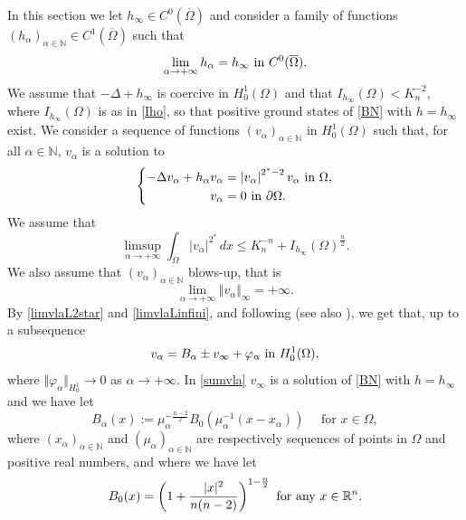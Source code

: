 \documentclass[10pt]{amsart}
\numberwithin{equation}{section}
\newcommand{\vp}{\varphi}
\newcommand{\Om}{\Omega}
\newcommand{\ma}{\mu_\alpha}
\def \rr {\mathbb{R}}
\def \bb{\hbox}
\def \vv {\mathbb{\Vert}}
\def \xl{x_\alpha}
\def \ma{\mu_{\alpha}}
\def \va{v_{\alpha}}
\def \ha{h_{\alpha}}
\def \hi{h_{\infty}}
\def \vo {v_{\infty}}
\def \nn{\mathbb{N}}
\theoremstyle{plain}
\theoremstyle{remark}
\begin{document}
	
In this section we let $h_{\infty}\in C^{0}(\overline{\Om})$ and consider a family of functions $(\ha)_{\alpha\in \nn}\in C^{1}(\overline{\Om})$ such that 
\begin{equation}\label{haconvhi}
	\lim_{\alpha\to +\infty}\ha =\hi \bb{ in } C^{0}(\overline{\Om}). 
\end{equation} 
We assume that $-\Delta+h_{\infty}$ is coercive in $H^1_0(\Om)$ and that $I_{\hi}(\Om)<K_n^{-2}$, where $I_{\hi}(\Om)$ is as in \eqref{Iho}, so that positive ground states of \eqref{BN} with $h = h_\infty$ exist. We consider a sequence of functions $(\va)_{\alpha\in \nn}$ in $H_0^1(\Om)$ such that, for all $\alpha\in \nn$, $v_{\alpha}$ is a solution to
\begin{equation}\label{critvlambda}
	\left\{\begin{aligned}
		-\Delta \va +h_{\alpha} \va &=\left|\va\right|^{2^*-2}\va \hbox{ in } \Omega, \\
		\va&= 0  \hbox{ in } \partial \Omega.
	\end{aligned}\right.
\end{equation}
We assume that
\begin{equation}\label{limvlaL2star}
	\limsup_{\alpha\to +\infty}\int_{\Om} |\va|^{2^*}\, dx \le K_n^{-n} +I_{\hi}(\Om)^{\frac{n}{2}}. 
\end{equation} 
We also assume that $(\va)_{\alpha \in \nn}$ blows-up, that is
\begin{equation}\label{limvlaLinfini}
	\lim_{\alpha\to +\infty} \vv \va\vv_{\infty}=+\infty.
\end{equation} 
By \eqref{limvlaL2star} and \eqref{limvlaLinfini}, and following \cite{Struwe} (see also \cite{StruweVariationalMethods}), we get that, up to a subsequence
\begin{equation}\label{sumvla}
	\va=B_{\alpha}\pm\vo+\vp_{\alpha} \bb{ in } H_0^1(\Om), 
\end{equation}
where $\vv \vp_{\alpha}\vv_{H_0^1}\to 0$ as $\alpha \to  +\infty$. In \eqref{sumvla} $v_\infty$ is a solution of \eqref{BN} with $h = h_\infty$ and we have let 
\begin{equation}\label{Bla}
	B_{\alpha}(x):=\ma^{-\frac{n-2}{2}}B_0(\ma^{-1}(x-\xl))
	\quad \text{ for } x \in \Om,
\end{equation}
where $(\xl)_{\alpha \in \nn}$ and $(\ma)_{\alpha \in \nn}$ are respectively sequences of points in $\Om$ and positive real numbers, and where we have let
\begin{equation}\label{B0}
B_0(x)=\left( 1+\frac{|x|^2}{n(n-2)}\right) ^{1-\frac{n}{2}} \bb{ for any } x\in \rr^n.
\end{equation} 
\end{document}
